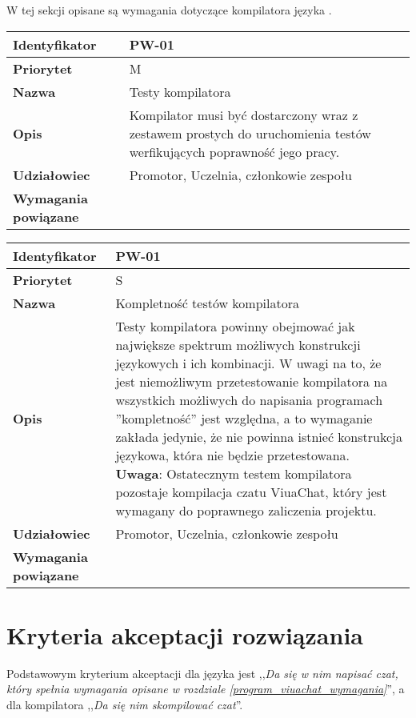 W tej sekcji opisane są wymagania dotyczące kompilatora języka \ViuAct.

\vspace{1em}

\begin{tabular}{ | l | l | }
    \hline
    \textbf{Identyfikator} & \parbox[t]{11cm}{PW-01} \\
    \hline
    \textbf{Priorytet} & M \\
    \hline
    \textbf{Nazwa} & Testy kompilatora \\
    \hline
    \textbf{Opis} & \parbox[t]{11cm}{
        Kompilator musi być dostarczony wraz z zestawem prostych do uruchomienia testów werfikujących
        poprawność jego pracy.
    } \\
    \hline
    \textbf{Udziałowiec} & Promotor, Uczelnia, członkowie zespołu \\
    \hline
    \textbf{Wymagania powiązane} & \phantom{} \\
    \hline
\end{tabular}

\vspace{1em}

\begin{tabular}{ | l | l | }
    \hline
    \textbf{Identyfikator} & \parbox[t]{11cm}{PW-01} \\
    \hline
    \textbf{Priorytet} & S \\
    \hline
    \textbf{Nazwa} & Kompletność testów kompilatora \\
    \hline
    \textbf{Opis} & \parbox[t]{11cm}{
        Testy kompilatora powinny obejmować jak największe spektrum możliwych konstrukcji językowych i
        ich kombinacji. W uwagi na to, że jest niemożliwym przetestowanie kompilatora na wszystkich
        możliwych do napisania programach ''kompletność'' jest względna, a to wymaganie zakłada jedynie, że
        nie powinna istnieć konstrukcja językowa, która nie będzie przetestowana. \\
        \textbf{Uwaga}: Ostatecznym testem kompilatora pozostaje kompilacja czatu ViuaChat, który jest
        wymagany do poprawnego zaliczenia projektu.
    } \\
    \hline
    \textbf{Udziałowiec} & Promotor, Uczelnia, członkowie zespołu \\
    \hline
    \textbf{Wymagania powiązane} & \phantom{} \\
    \hline
\end{tabular}

\section{Kryteria akceptacji rozwiązania}

Podstawowym kryterium akceptacji dla języka jest
,,\emph{Da się w nim napisać czat, który spełnia wymagania opisane w
rozdziale \ref{program_viuachat_wymagania}}'',
a dla kompilatora ,,\emph{Da się nim skompilować czat}''.
